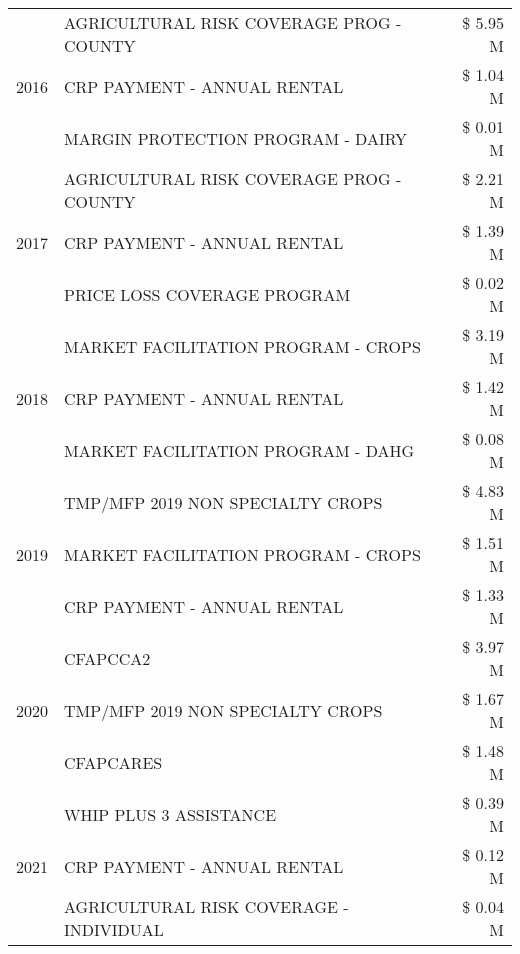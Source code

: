 \begin{tabular}{llr}
\cline{1-3}
\multirow[t]{3}{*}{2016} & AGRICULTURAL RISK COVERAGE PROG - COUNTY      & \$ 5.95 M \\
 & CRP PAYMENT - ANNUAL RENTAL                   & \$ 1.04 M \\
 & MARGIN PROTECTION PROGRAM - DAIRY             & \$ 0.01 M \\
\cline{1-3}
\multirow[t]{3}{*}{2017} & AGRICULTURAL RISK COVERAGE PROG - COUNTY & \$ 2.21 M \\
 & CRP PAYMENT - ANNUAL RENTAL & \$ 1.39 M \\
 & PRICE LOSS COVERAGE PROGRAM & \$ 0.02 M \\
\cline{1-3}
\multirow[t]{3}{*}{2018} & MARKET FACILITATION PROGRAM - CROPS & \$ 3.19 M \\
 & CRP PAYMENT - ANNUAL RENTAL & \$ 1.42 M \\
 & MARKET FACILITATION PROGRAM - DAHG & \$ 0.08 M \\
\cline{1-3}
\multirow[t]{3}{*}{2019} & TMP/MFP 2019 NON SPECIALTY CROPS & \$ 4.83 M \\
 & MARKET FACILITATION PROGRAM - CROPS & \$ 1.51 M \\
 & CRP PAYMENT - ANNUAL RENTAL & \$ 1.33 M \\
\cline{1-3}
\multirow[t]{3}{*}{2020} & CFAPCCA2 & \$ 3.97 M \\
 & TMP/MFP 2019 NON SPECIALTY CROPS & \$ 1.67 M \\
 & CFAPCARES & \$ 1.48 M \\
\cline{1-3}
\multirow[t]{3}{*}{2021} & WHIP PLUS 3 ASSISTANCE & \$ 0.39 M \\
 & CRP PAYMENT - ANNUAL RENTAL & \$ 0.12 M \\
 & AGRICULTURAL RISK COVERAGE - INDIVIDUAL & \$ 0.04 M \\
\cline{1-3}
\bottomrule
\end{tabular}
